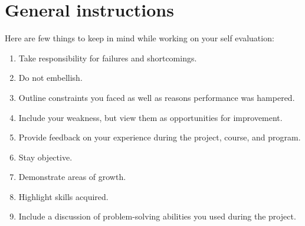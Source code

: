 \documentclass[11pt, oneside]{article}   	%
\begin{document}
\section{General instructions}

Here are few things to keep in mind while working on your self evaluation:
\begin{enumerate}
\item Take responsibility for failures and shortcomings.
\item Do not embellish.
\item Outline constraints you faced as well as reasons performance was hampered.
\item Include your weakness, but view them as opportunities for improvement.
\item Provide feedback on your experience during the project, course, and program.
\item Stay objective.
\item Demonstrate areas of growth.
\item Highlight skills acquired.
\item Include a discussion of problem-solving abilities you used during the project.
\end{enumerate}
\end{document}
